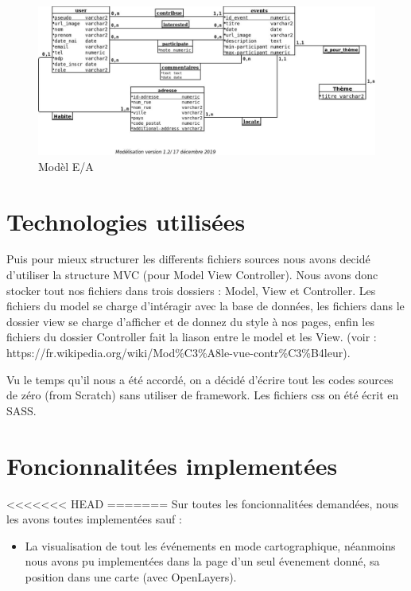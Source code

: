 \documentclass[oneside,11pt,a4paper]{article}
\begin{document}
\begin{figure}[h]
  \centering
  \includegraphics[width=1\textwidth]{../database/modelisation.jpeg}
  \caption{Modèl E/A}
\end{figure}
  
\section{Technologies utilisées}

Puis pour mieux structurer les differents fichiers sources nous avons decidé d'utiliser la structure MVC (pour Model View Controller). Nous avons donc stocker tout nos fichiers dans trois dossiers : Model, View et Controller. Les fichiers du model se charge d'intéragir avec la base de données, les fichiers dans le dossier view se charge d'afficher et de donnez du style à nos pages, enfin les fichiers du dossier Controller fait la liason entre le model et les View. (voir : https://fr.wikipedia.org/wiki/Mod\%C3\%A8le-vue-contr\%C3\%B4leur).


Vu le temps qu'il nous a été accordé, on a décidé d'écrire tout les codes sources de zéro (from Scratch) sans utiliser de framework. 
Les fichiers css on été écrit en SASS.

\section{Foncionnalitées implementées}

<<<<<<< HEAD
=======
Sur toutes les foncionnalitées demandées, nous les avons toutes implementées sauf :

\begin{itemize}
  \item La visualisation de tout les événements en mode cartographique, néanmoins nous avons pu implementées dans la page d'un seul évenement donné, sa position dans une carte (avec OpenLayers).
\end{itemize}
\end{document}
